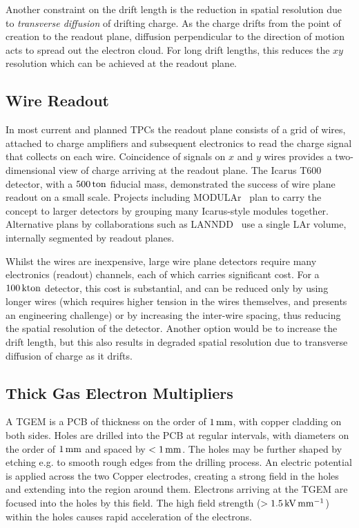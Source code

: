 Another constraint on the drift length is the reduction in spatial resolution due to \emph{transverse diffusion} of drifting charge. As the charge drifts from the point of creation to the readout plane, diffusion perpendicular to the direction of motion acts to spread out the electron cloud. For long drift lengths, this reduces the $xy$ resolution which can be achieved at the readout plane.

\subsection{Wire Readout}
In most current and planned \acsp{TPC} the readout plane consists of a grid of wires, attached to charge amplifiers and subsequent electronics to read the charge signal that collects on each wire. Coincidence of signals on $x$ and $y$ wires provides a two-dimensional view of charge arriving at the readout plane. The {\sc Icarus} T600~\citep{Amerio2004} detector, with a $500\,\mathrm{ton}$ fiducial mass, demonstrated the success of wire plane readout on a small scale. Projects including MODULAr~\citep{Baibussinov2008} plan to carry the concept to larger detectors by grouping many {\sc Icarus}-style modules together. Alternative plans by collaborations such as LANNDD~\citep{Cline2003} use a single \ac{LAr} volume, internally segmented by readout planes.

Whilst the wires are inexpensive, large wire plane detectors require many electronics (readout) channels, each of which carries significant cost. For a $100\,\mathrm{kton}$ detector, this cost is substantial, and can be reduced only by using longer wires (which requires higher tension in the wires themselves, and presents an engineering challenge) or by increasing the inter-wire spacing, thus reducing the spatial resolution of the detector. Another option would be to increase the drift length, but this also results in degraded spatial resolution due to transverse diffusion of charge as it drifts.

\subsection{Thick Gas Electron Multipliers}
A \ac{TGEM} is a \ac{PCB} of thickness on the order of $1\,\mathrm{mm}$, with copper cladding on both sides. Holes are drilled into the \ac{PCB} at regular intervals, with diameters on the order of $1\,\mathrm{mm}$ and spaced by $< 1\,\mathrm{mm}$. The holes may be further shaped by etching e.g. to smooth rough edges from the drilling process. An electric potential is applied across the two Copper electrodes, creating a strong field in the holes and extending into the region around them. Electrons arriving at the \ac{TGEM} are focused into the holes by this field. The high field strength ($> 1.5 \,\mathrm{kV} \,\mathrm{mm}^{-1}$) within the holes causes rapid acceleration of the electrons.

